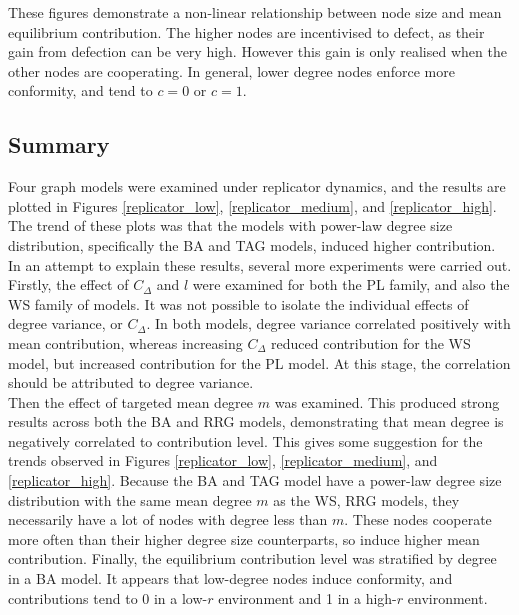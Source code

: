 These figures demonstrate a non-linear relationship between node size and mean equilibrium contribution. The higher nodes are incentivised to defect, as their gain from defection can be very high. However this gain is only realised when the other nodes are cooperating. In general, lower degree nodes enforce more conformity, and tend to $c=0$ or $c=1$.

\subsection{Summary}
Four graph models were examined under replicator dynamics, and the results are plotted in Figures \ref{replicator_low}, \ref{replicator_medium}, and \ref{replicator_high}. The trend of these plots was that the models with power-law degree size distribution, specifically the BA and TAG models, induced higher contribution. In an attempt to explain these results, several more experiments were carried out. \\

Firstly, the effect of $C_\Delta$ and $l$ were examined for both the PL family, and also the WS family of models. It was not possible to isolate the individual effects of degree variance, or $C_\Delta$. In both models, degree variance correlated positively with mean contribution, whereas increasing $C_\Delta$ reduced contribution for the WS model, but increased contribution for the PL model. At this stage, the correlation should be attributed to degree variance. \\

Then the effect of targeted mean degree $m$ was examined. This produced strong results across both the BA and RRG models, demonstrating that mean degree is negatively correlated to contribution level. This gives some suggestion for the trends observed in Figures \ref{replicator_low}, \ref{replicator_medium}, and \ref{replicator_high}. Because the BA and TAG model have a power-law degree size distribution with the same mean degree $m$ as the WS, RRG models, they necessarily have a lot of nodes with degree less than $m$. These nodes cooperate more often than their higher degree size counterparts, so induce higher mean contribution. Finally, the equilibrium contribution level was stratified by degree in a BA model. It appears that low-degree nodes induce conformity, and contributions tend to 0 in a low-$r$ environment and 1 in a high-$r$ environment.  

